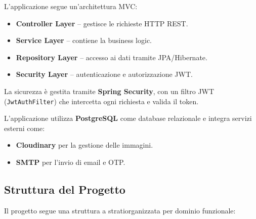 \documentclass[12pt, a4paper]{article}
\begin{document}
    L'applicazione segue un'architettura MVC:

    \begin{itemize}
        \item \textbf{Controller Layer} -- gestisce le richieste HTTP REST.
        \item \textbf{Service Layer} -- contiene la business logic.
        \item \textbf{Repository Layer} -- accesso ai dati tramite JPA/Hibernate.
        \item \textbf{Security Layer} -- autenticazione e autorizzazione JWT.
    \end{itemize}

    La sicurezza è gestita tramite \textbf{Spring Security}, con un filtro JWT
    (\texttt{JwtAuthFilter}) che intercetta ogni richiesta e valida il token.

    L'applicazione utilizza \textbf{PostgreSQL} come database relazionale e
    integra servizi esterni come:
    \begin{itemize}
        \item \textbf{Cloudinary} per la gestione delle immagini.
        \item \textbf{SMTP} per l'invio di email e OTP.
    \end{itemize}

    \subsection{Struttura del Progetto}

    Il progetto segue una struttura a stratiorganizzata per dominio funzionale:
\end{document}
